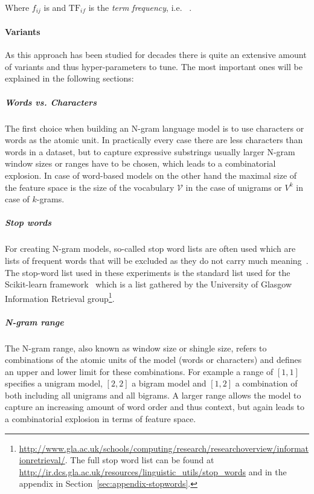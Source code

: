 Where $f_{ij}$ is  and $\text{TF}_{if}$ is the \emph{term frequency}, i.e.   ~\cite[Chapter 1.3.1, p.~8]{Leskovec:2014aa}.

\paragraph{Variants}

As this approach has been studied for decades  there is quite an extensive amount of variants and thus hyper-parameters to tune. The most important ones will be explained in the following sections:

\subparagraph{Words vs. Characters} The first choice when building an N-gram language model is to use characters or words as the atomic unit. In practically every case there are less characters than words in a dataset, but to capture expressive substrings usually larger N-gram window sizes or ranges have to be chosen, which leads to a combinatorial explosion. In case of word-based models on the other hand the maximal size of the feature space is the size of the vocabulary $\mathcal{V}$ in the case of unigrams or $V^k$ in case of $k$-grams.

\subparagraph{Stop words}
\label{subp:Stop words}
For creating N-gram models, so-called stop word lists are often used which are lists of frequent words that will be excluded as they do not carry much meaning~\cite[Chapter 1.3.1, p.~7]{Leskovec:2014aa}. The stop-word list used in these experiments is the standard list used for the Scikit-learn framework~\cite{Pedregosa:2011aa} which is a list gathered by the University of Glasgow Information Retrieval group\footnote{\url{http://www.gla.ac.uk/schools/computing/research/researchoverview/informationretrieval/}. The full stop word list can be found at \url{http://ir.dcs.gla.ac.uk/resources/linguistic_utils/stop_words} and in the appendix in Section~\ref{sec:appendix-stopwords}.}.

\subparagraph{N-gram range} The N-gram range, also known as window size or shingle size, refers to combinations of the atomic units of the model (words or characters) and defines an upper and lower limit for these combinations. For example a range of $[1,1]$ specifies a unigram model, $[2,2]$ a bigram model and $[1,2]$ a combination of both including all unigrams and all bigrams.
A larger range allows the model to capture an increasing amount of word order and thus context, but again leads to a combinatorial explosion in terms of feature space.

